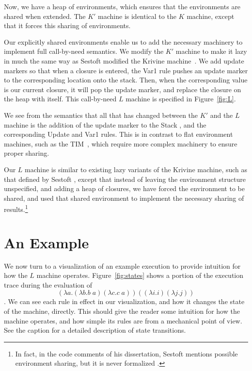 \documentclass[preprint]{sigplanconf}
\begin{document}


Now, we have a heap of environments, which ensures that the
environments are shared when extended.  The $K'$ machine is identical to the $K$
machine, except that it forces this sharing of environments. 

Our explicitly shared environments enable us to add the necessary
machinery to implement full call-by-need semantics. We modify the $K'$ machine
to make it lazy in much the same way as Sestoft modified the Krivine
machine~\cite{sestoft}. We add update markers so that when a closure is entered,
the Var1 rule pushes an update marker to the corresponding location onto the
stack.  Then, when the corresponding value is our current closure, it will pop
the update marker, and replace the closure on the heap with itself. This
call-by-need $L$ machine is specified in Figure~\ref{fig:L}.



We see from the semantics that all that has changed between the $K'$ and the
$L$ machine is the addition of the update marker to the Stack 
, and the corresponding Update and Var1 rules. This is in contrast to flat
environment machines, such as the TIM~\cite{TIM}, which require more complex
machinery to ensure proper sharing.

Our $L$ machine is similar to existing lazy variants of the Krivine machine,
such as that defined by Sestoft \cite{sestoft}, except that instead of leaving
the environment structure unspecified, and adding a heap of closures, we have
forced the environment to be shared, and used that shared environment to
implement the necessary sharing of results.\footnote{In fact, in the code
comments of his dissertation, Sestoft mentions possible environment sharing, but
it is never formalized \cite{sestoft91analysis}.} 

\section{An Example}

We now turn to a visualization of an example execution to provide intuition for
how the $L$ machine operates. Figure~\ref{fig:states} shows a portion of the
execution trace during the evaluation of $$(\lambda a.(\lambda b.b \; a)
(\lambda c.c \; a)) ((\lambda i.i) (\lambda j.j))$$.   We
can see each rule in effect in our visualization, and how it changes the state
of the machine, directly. This should give the reader some intuition for how the
machine operates, and how simple its rules are from a mechanical point of view.
See the caption for a detailed description of state transitions. 
\end{document}
